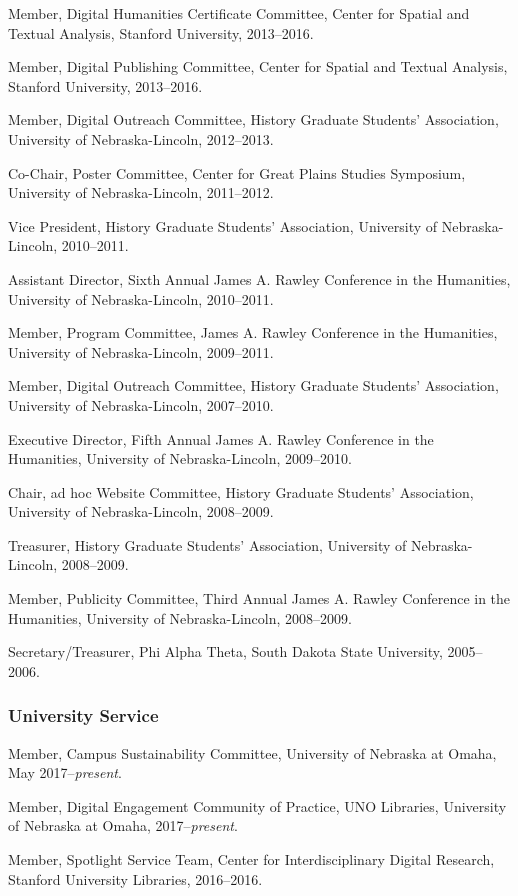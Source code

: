 Member, Digital Humanities Certificate Committee, Center for Spatial and
Textual Analysis, Stanford University, 2013--2016.

Member, Digital Publishing Committee, Center for Spatial and Textual
Analysis, Stanford University, 2013--2016.

Member, Digital Outreach Committee, History Graduate Students'
Association, University of Nebraska-Lincoln, 2012--2013.

Co-Chair, Poster Committee, Center for Great Plains Studies Symposium,
University of Nebraska-Lincoln, 2011--2012.

Vice President, History Graduate Students' Association, University of
Nebraska-Lincoln, 2010--2011.

Assistant Director, Sixth Annual James A. Rawley Conference in the
Humanities, University of Nebraska-Lincoln, 2010--2011.

Member, Program Committee, James A. Rawley Conference in the Humanities,
University of Nebraska-Lincoln, 2009--2011.

Member, Digital Outreach Committee, History Graduate Students'
Association, University of Nebraska-Lincoln, 2007--2010.

Executive Director, Fifth Annual James A. Rawley Conference in the
Humanities, University of Nebraska-Lincoln, 2009--2010.

Chair, ad hoc Website Committee, History Graduate Students' Association,
University of Nebraska-Lincoln, 2008--2009.

Treasurer, History Graduate Students' Association, University of
Nebraska-Lincoln, 2008--2009.

Member, Publicity Committee, Third Annual James A. Rawley Conference in
the Humanities, University of Nebraska-Lincoln, 2008--2009.

Secretary/Treasurer, Phi Alpha Theta, South Dakota State University,
2005--2006.

\subsubsection{University Service}\label{university-service}

Member, Campus Sustainability Committee, University of Nebraska at
Omaha, May 2017--\emph{present}.

Member, Digital Engagement Community of Practice, UNO Libraries,
University of Nebraska at Omaha, 2017--\emph{present}.

Member, Spotlight Service Team, Center for Interdisciplinary Digital
Research, Stanford University Libraries, 2016--2016.

